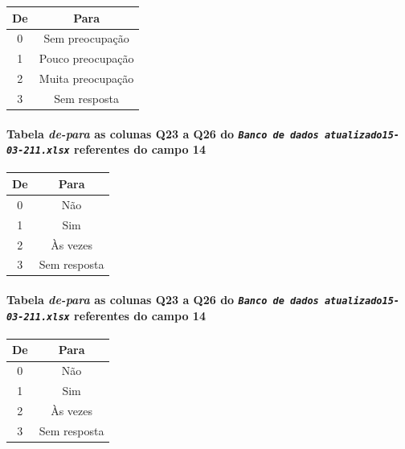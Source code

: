 \documentclass[]{article}
\let\oldparagraph\paragraph
\renewcommand{\paragraph}[1]{\oldparagraph{#1}\mbox{}}
\begin{document}
\begin{longtable}[]{@{}cc@{}}
\toprule
De & Para\tabularnewline
\midrule
\endhead
0 & Sem preocupação\tabularnewline
1 & Pouco preocupação\tabularnewline
2 & Muita preocupação\tabularnewline
3 & Sem resposta\tabularnewline
\bottomrule
\end{longtable}

\hypertarget{tabela-de-para-as-colunas-q23-a-q26-do-banco-de-dados-atualizado15-03-211.xlsx-referentes-do-campo-14}{%
\paragraph{\texorpdfstring{Tabela \emph{de-para} as colunas Q23 a Q26 do \emph{\texttt{Banco\ de\ dados\ atualizado15-03-211.xlsx}} referentes do campo 14}{Tabela de-para as colunas Q23 a Q26 do Banco de dados atualizado15-03-211.xlsx referentes do campo 14}}\label{tabela-de-para-as-colunas-q23-a-q26-do-banco-de-dados-atualizado15-03-211.xlsx-referentes-do-campo-14}}

\begin{longtable}[]{@{}cc@{}}
\toprule
De & Para\tabularnewline
\midrule
\endhead
0 & Não\tabularnewline
1 & Sim\tabularnewline
2 & Às vezes\tabularnewline
3 & Sem resposta\tabularnewline
\bottomrule
\end{longtable}

\hypertarget{tabela-de-para-as-colunas-q23-a-q26-do-banco-de-dados-atualizado15-03-211.xlsx-referentes-do-campo-14-1}{%
\paragraph{\texorpdfstring{Tabela \emph{de-para} as colunas Q23 a Q26 do \emph{\texttt{Banco\ de\ dados\ atualizado15-03-211.xlsx}} referentes do campo 14}{Tabela de-para as colunas Q23 a Q26 do Banco de dados atualizado15-03-211.xlsx referentes do campo 14}}\label{tabela-de-para-as-colunas-q23-a-q26-do-banco-de-dados-atualizado15-03-211.xlsx-referentes-do-campo-14-1}}

\begin{longtable}[]{@{}cc@{}}
\toprule
De & Para\tabularnewline
\midrule
\endhead
0 & Não\tabularnewline
1 & Sim\tabularnewline
2 & Às vezes\tabularnewline
3 & Sem resposta\tabularnewline
\bottomrule
\end{longtable}
\end{document}
